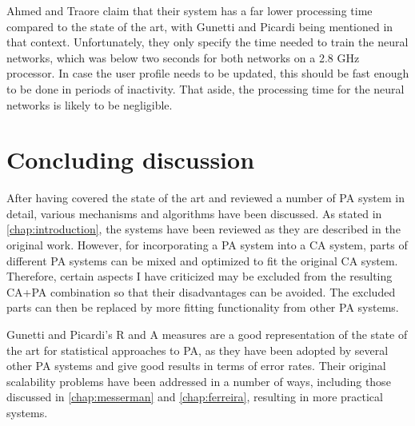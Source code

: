 \documentclass[informationsecurity]{gucmasterproject}
\begin{document}
Ahmed and Traore \cite{Ahmed} claim that their system has a far lower processing time compared to the state of the art, with Gunetti and Picardi \cite{gnp} being mentioned in that context.
Unfortunately, they only specify the time needed to train the neural networks, which was below two seconds for both networks on a 2.8 GHz processor.
In case the user profile needs to be updated, this should be fast enough to be done in periods of inactivity.
That aside, the processing time for the neural networks is likely to be negligible.








\chapter{Concluding discussion}
\label{chap:conclusion}

After having covered the state of the art and reviewed a number of PA system in detail, various mechanisms and algorithms have been discussed.
As stated in \cref{chap:introduction}, the systems have been reviewed as they are described in the original work.
However, for incorporating a PA system into a CA system, parts of different PA systems can be mixed and optimized to fit the original CA system.
Therefore, certain aspects I have criticized may be excluded from the resulting CA+PA combination so that their disadvantages can be avoided.
The excluded parts can then be replaced by more fitting functionality from other PA systems.

Gunetti and Picardi's \cite{gnp} R and A measures are a good representation of the state of the art for statistical approaches to PA, as they have been adopted by several other PA systems and give good results in terms of error rates.
Their original scalability problems have been addressed in a number of ways, including those discussed in \cref{chap:messerman} and \cref{chap:ferreira}, resulting in more practical systems.
\end{document}
